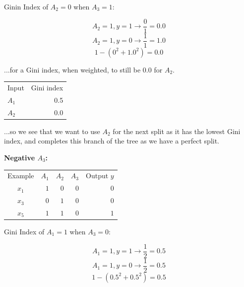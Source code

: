 \documentclass{article}
\begin{document}
\noindent Ginin  Index of $A_2=0$ when $A_3=1$:

\begin{equation}
    {A_2=1,y=1} \rightarrow \frac{0}{1} = 0.0
\end{equation}
\begin{equation}
    {A_2=1,y=0} \rightarrow \frac{1}{1} = 1.0
\end{equation}
\begin{equation}
    1 - (0^2 + 1.0^2) = 0.0
\end{equation}

\noindent ...for a Gini index, when weighted, to still be $0.0$ for $A_2$.

\begin{center}
    \begin{tabular}{l r}
        Input & Gini index \\
        $A_1$ & 0.5 \\
        $A_2$ & 0.0 \\
    \end{tabular}
\end{center}

\noindent ...so we see that we want to use $A_2$ for the next split as it has the lowest Gini index, and completes this branch of the tree as we have a perfect split.

\noindent \textbf{Negative $A_3$:}

\begin{center}
    \begin{tabular}{ c r r r r }
        Example & $A_1$ & $A_2$ & $A_3$ & Output $y$\\ 
        $x_1$ & $1$ & $0$ & $0$ & $0$\\
        $x_3$ & $0$ & $1$ & $0$ & $0$\\
        $x_5$ & $1$ & $1$ & $0$ & $1$\\
    \end{tabular}
\end{center}

\noindent Gini Index of $A_1=1$ when $A_3=0$:

\begin{equation}
    {A_1=1,y=1} \rightarrow \frac{1}{2} = 0.5
\end{equation}
\begin{equation}
    {A_1=1,y=0} \rightarrow \frac{1}{2} = 0.5
\end{equation}
\begin{equation}
    1 - (0.5^2 + 0.5^2) = 0.5
\end{equation}
\end{document}
